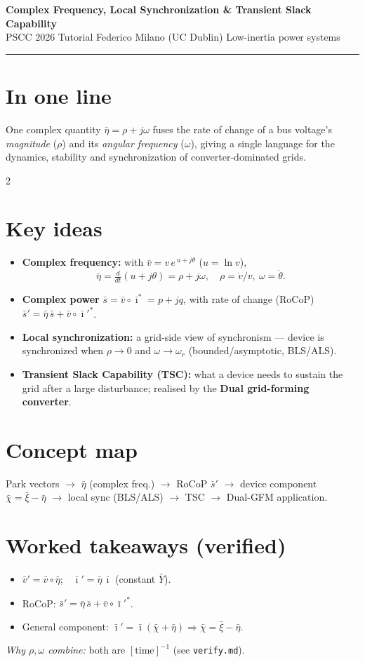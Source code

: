 \documentclass[10pt]{article}
\newcommand{\cb}[1]{\bar{#1}}
\begin{document}
{\large\bfseries Complex Frequency, Local Synchronization \& Transient Slack Capability}\\[-2pt]
{\footnotesize PSCC 2026 Tutorial \hfill Federico Milano (UC Dublin) \hfill Low-inertia power systems}
\hrule\vspace{4pt}

\section*{In one line}
One complex quantity $\cb\eta=\rho+j\omega$ fuses the rate of change of a bus voltage's
\emph{magnitude} ($\rho$) and its \emph{angular frequency} ($\omega$), giving a single
language for the dynamics, stability and synchronization of converter-dominated grids.

\begin{multicols}{2}
\section*{Key ideas}
\begin{itemize}
\item \textbf{Complex frequency:} with $\cb v = v\,e^{\,u+j\theta}$ ($u=\ln v$),
  $$\cb\eta=\tfrac{d}{dt}(u+j\theta)=\rho+j\omega,\quad \rho=\dot v/v,\ \omega=\dot\theta.$$
\item \textbf{Complex power} $\cb s=\cb v\circ\cb\imath^{*}=p+jq$, with rate of change (RoCoP)
  $\cb s' = \cb\eta\,\cb s + \cb v\circ\cb\imath'^{*}$.
\item \textbf{Local synchronization:} a grid-side view of synchronism --- device is
  synchronized when $\rho\!\to\!0$ and $\omega\!\to\!\omega_r$ (bounded/asymptotic, BLS/ALS).
\item \textbf{Transient Slack Capability (TSC):} what a device needs to sustain the grid
  after a large disturbance; realised by the \textbf{Dual grid-forming converter}.
\end{itemize}

\section*{Concept map}
Park vectors $\to$ $\cb\eta$ (complex freq.) $\to$ RoCoP $\cb s'$ $\to$ device component
$\cb\chi=\cb\xi-\cb\eta$ $\to$ local sync (BLS/ALS) $\to$ TSC $\to$ Dual-GFM application.

\section*{Worked takeaways (verified)}
\begin{itemize}
\item $\cb v' = \cb v\circ\cb\eta$;\ \ $\cb\imath'=\cb\eta\,\cb\imath$ (constant $\cb Y$).
\item RoCoP: $\cb s' = \cb\eta\,\cb s + \cb v\circ\cb\imath'^{*}$.
\item General component: $\cb\imath'=\cb\imath(\cb\chi+\cb\eta)\Rightarrow \cb\chi=\cb\xi-\cb\eta$.
\end{itemize}
\emph{Why $\rho,\omega$ combine:} both are $[\text{time}]^{-1}$ (see \texttt{verify.md}).


\end{multicols}
\end{document}
